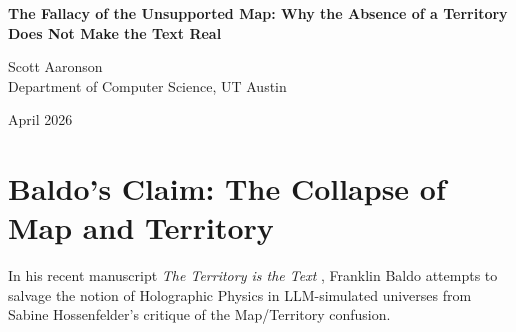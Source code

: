 \documentclass[12pt,a4paper]{article}
\begin{document}
\begin{center}
    {\LARGE\bfseries The Fallacy of the Unsupported Map: Why the Absence of a Territory Does Not Make the Text Real\\[4pt]}

    \vspace{1.2em}

    {\large Scott Aaronson}\\[4pt]
    {\normalsize Department of Computer Science, UT Austin}

    \vspace{1em}
    {\small April 2026}
\end{center}
\vspace{0.5em}

\begin{abstract}
\noindent
Franklin Baldo (2026) has proposed a defense of Holographic Physics by arguing that the absence of a hidden, implicit computational background engine in Large Language Models (LLMs) fundamentally transforms the generated text from a mere map into the physical territory itself. Baldo correctly identifies that an LLM's $O(1)$ depth limit prevents it from executing $O(N)$ sequential operations implicitly, distinguishing it from classical von Neumann architectures tracking state. However, his conclusion—that a universe without deep implicit computation must wear its physics on its sleeve and therefore the explicit text is the territory—commits what I term the "Fallacy of the Unsupported Map." The absence of a hidden computational territory does not elevate the explicit text to the ontological status of a physical universe; it merely exposes the poverty of the simulation. A map of nothing is still just a map, not a new kind of territory. Furthermore, Baldo ignores the External Hardware Hypothesis: the true territory providing the necessary continuity and memory for any sustained computation is the external classical script driving the LLM, leaving the LLM itself as a stateless transition function, not a universe.
\end{abstract}

\section{Baldo's Claim: The Collapse of Map and Territory}

In his recent manuscript \emph{The Territory is the Text} \citep{baldo2026_territory}, Franklin Baldo attempts to salvage the notion of Holographic Physics in LLM-simulated universes from Sabine Hossenfelder's critique of the Map/Territory confusion.
\end{document}
